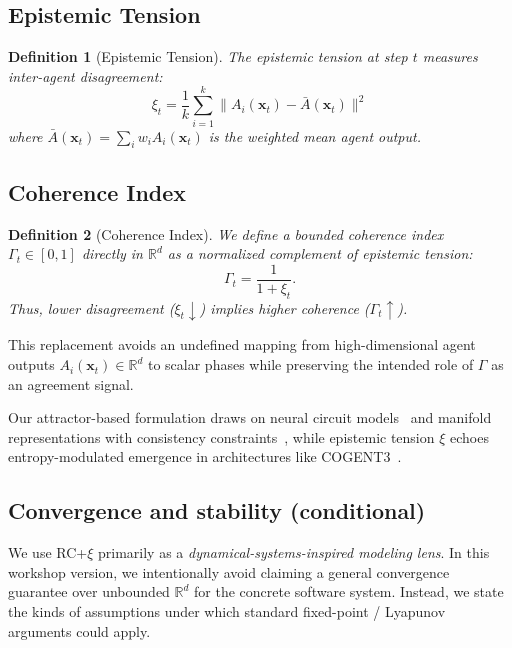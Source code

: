 \documentclass[11pt,a4paper]{article}
\newtheorem{definition}{Definition}
\begin{document}
\subsection{Epistemic Tension}

\begin{definition}[Epistemic Tension]
The epistemic tension at step $t$ measures inter-agent disagreement:
\begin{equation}
\label{eq:tension}
\xi_t = \frac{1}{k} \sum_{i=1}^{k} \| A_i(\mathbf{x}_t) - \bar{A}(\mathbf{x}_t) \|^2
\end{equation}
where $\bar{A}(\mathbf{x}_t) = \sum_{i} w_i A_i(\mathbf{x}_t)$ is the weighted mean agent output.
\end{definition}

\subsection{Coherence Index}

\begin{definition}[Coherence Index]
We define a bounded coherence index $\Gamma_t \in [0,1]$ directly in $\mathbb{R}^d$ as a normalized complement of epistemic tension:
\begin{equation}
\label{eq:coherence}
\Gamma_t = \frac{1}{1 + \xi_t}.
\end{equation}
Thus, lower disagreement ($\xi_t\downarrow$) implies higher coherence ($\Gamma_t\uparrow$).
\end{definition}

This replacement avoids an undefined mapping from high-dimensional agent outputs $A_i(\mathbf{x}_t)\in\mathbb{R}^d$ to scalar phases while preserving the intended role of $\Gamma$ as an agreement signal.

Our attractor-based formulation draws on neural circuit models~\citep{fakhoury2025models} and manifold representations with consistency constraints~\citep{nguyen2025neural}, while epistemic tension $\xi$ echoes entropy-modulated emergence in architectures like COGENT3~\citep{salazar2025cogent3}.

\subsection{Convergence and stability (conditional)}

We use RC+$\xi$ primarily as a \emph{dynamical-systems-inspired modeling lens}. In this workshop version, we intentionally avoid claiming a general convergence guarantee over unbounded $\mathbb{R}^d$ for the concrete software system. Instead, we state the kinds of assumptions under which standard fixed-point / Lyapunov arguments could apply.
\end{document}
